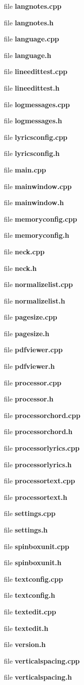 \begin{DoxyCompactItemize}
file \textbf{ langnotes.\+cpp}
\item 
file \textbf{ langnotes.\+h}
\item 
file \textbf{ language.\+cpp}
\item 
file \textbf{ language.\+h}
\item 
file \textbf{ lineedittest.\+cpp}
\item 
file \textbf{ lineedittest.\+h}
\item 
file \textbf{ logmessages.\+cpp}
\item 
file \textbf{ logmessages.\+h}
\item 
file \textbf{ lyricsconfig.\+cpp}
\item 
file \textbf{ lyricsconfig.\+h}
\item 
file \textbf{ main.\+cpp}
\item 
file \textbf{ mainwindow.\+cpp}
\item 
file \textbf{ mainwindow.\+h}
\item 
file \textbf{ memoryconfig.\+cpp}
\item 
file \textbf{ memoryconfig.\+h}
\item 
file \textbf{ neck.\+cpp}
\item 
file \textbf{ neck.\+h}
\item 
file \textbf{ normalizelist.\+cpp}
\item 
file \textbf{ normalizelist.\+h}
\item 
file \textbf{ pagesize.\+cpp}
\item 
file \textbf{ pagesize.\+h}
\item 
file \textbf{ pdfviewer.\+cpp}
\item 
file \textbf{ pdfviewer.\+h}
\item 
file \textbf{ processor.\+cpp}
\item 
file \textbf{ processor.\+h}
\item 
file \textbf{ processorchord.\+cpp}
\item 
file \textbf{ processorchord.\+h}
\item 
file \textbf{ processorlyrics.\+cpp}
\item 
file \textbf{ processorlyrics.\+h}
\item 
file \textbf{ processortext.\+cpp}
\item 
file \textbf{ processortext.\+h}
\item 
file \textbf{ settings.\+cpp}
\item 
file \textbf{ settings.\+h}
\item 
file \textbf{ spinboxunit.\+cpp}
\item 
file \textbf{ spinboxunit.\+h}
\item 
file \textbf{ textconfig.\+cpp}
\item 
file \textbf{ textconfig.\+h}
\item 
file \textbf{ textedit.\+cpp}
\item 
file \textbf{ textedit.\+h}
\item 
file \textbf{ version.\+h}
\item 
file \textbf{ verticalspacing.\+cpp}
\item 
file \textbf{ verticalspacing.\+h}
\end{DoxyCompactItemize}
